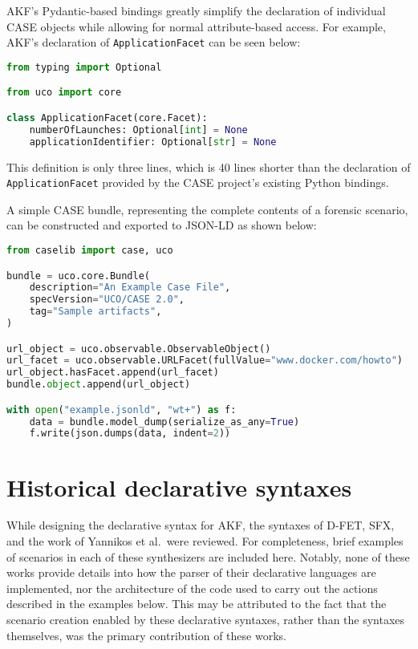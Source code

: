 \documentclass[letterpaper,12pt]{report}
\newcommand{\passthrough}[1]{#1}
\begin{document}
AKF's Pydantic-based bindings greatly simplify the declaration of
individual CASE objects while allowing for normal attribute-based
access. For example, AKF's declaration of
\passthrough{\lstinline!ApplicationFacet!} can be seen below:

\begin{lstlisting}[language=Python]
from typing import Optional

from uco import core

class ApplicationFacet(core.Facet):
    numberOfLaunches: Optional[int] = None
    applicationIdentifier: Optional[str] = None
\end{lstlisting}

This definition is only three lines, which is 40 lines shorter than the
declaration of \passthrough{\lstinline!ApplicationFacet!} provided by
the CASE project's existing Python bindings.

A simple CASE bundle, representing the complete contents of a forensic
scenario, can be constructed and exported to JSON-LD as shown below:

\begin{lstlisting}[language=Python]
from caselib import case, uco

bundle = uco.core.Bundle(
    description="An Example Case File",
    specVersion="UCO/CASE 2.0",
    tag="Sample artifacts",
)

url_object = uco.observable.ObservableObject()
url_facet = uco.observable.URLFacet(fullValue="www.docker.com/howto")
url_object.hasFacet.append(url_facet)
bundle.object.append(url_object)

with open("example.jsonld", "wt+") as f:
    data = bundle.model_dump(serialize_as_any=True)
    f.write(json.dumps(data, indent=2))
\end{lstlisting}

\section{Historical declarative
syntaxes}\label{historical-declarative-syntaxes}

While designing the declarative syntax for AKF, the syntaxes of D-FET,
SFX, and the work of Yannikos et al.~were reviewed. For completeness,
brief examples of scenarios in each of these synthesizers are included
here. Notably, none of these works provide details into how the parser
of their declarative languages are implemented, nor the architecture of
the code used to carry out the actions described in the examples below.
This may be attributed to the fact that the scenario creation enabled by
these declarative syntaxes, rather than the syntaxes themselves, was the
primary contribution of these works.
\end{document}
